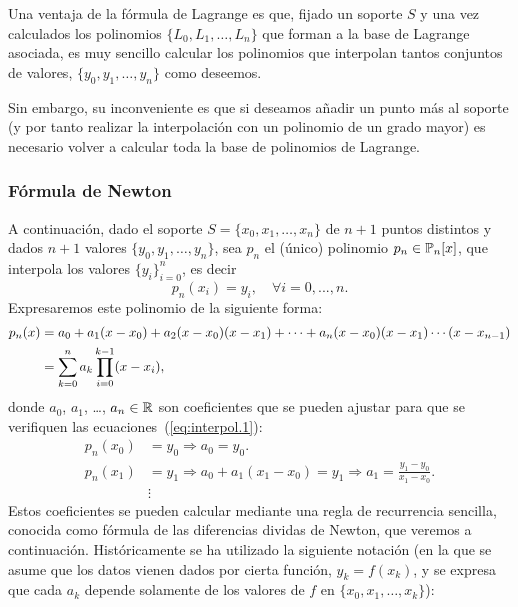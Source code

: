 \begin{remark}
  Una ventaja de la fórmula de Lagrange es que, fijado un soporte $S$
  y una vez calculados los polinomios $\{L_0,L_1,\dots, L_n\}$ que
  forman a la base de Lagrange asociada, es muy sencillo calcular los
  polinomios que interpolan tantos conjuntos de valores,
  $\{y_0,y_1,\dots,y_n\}$ como deseemos. 
  
  Sin embargo, su inconveniente es que si deseamos añadir un punto más
  al soporte (y por tanto realizar la interpolación con un polinomio
  de un grado mayor) es necesario volver a calcular toda la base de
  polinomios de Lagrange.
\end{remark}

\subsubsection{Fórmula de Newton}
\label{sec:formula-de-newton}
A continuación, dado el soporte $S=\{x_0,x_1,\dots,x_n\}$ de $n+1$ puntos
distintos y dados $n+1$ valores $\{y_0,y_1,\dots,y_n\}$, sea
$p_n$ el (único) polinomio $p_n \in \operatorname{{\mathbb P}}_n[x]$, que
interpola los valores $\{y_i\}_{i=0}^n$, es decir
\begin{equation}
p_n(x_i)=y_i, \quad \forall i=0,...,n.
\label{eq:interpol.1}
\end{equation}
Expresaremos este polinomio de la siguiente forma:
\begin{align}
  \notag
  p_n(x)&=a_0 + a_1 (x-x_0) + a_2(x-x_0)(x-x_1) + \cdots 
  + a_n(x-x_0)(x-x_1)\cdots(x-x_{n-1}) \\
  &=\sum_{k=0}^n a_k \prod_{i=0}^{k-1}(x-x_i),
\label{eq:pol.newton.dif-div}
\end{align}
donde $a_0$, $a_1$, \dots, $a_n\in\operatorname{{\mathbb R}}$ son coeficientes que se
pueden ajustar para que se verifiquen las
ecuaciones~(\ref{eq:interpol.1}):
\begin{align*}
  p_n(x_0)&=y_0 \Rightarrow a_0=y_0.\\
  p_n(x_1)&=y_1 \Rightarrow a_0+a_1(x_1-x_0)=y_1 
  \Rightarrow a_1=\frac{y_1-y_0}{x_1-x_0}.\\
  &\vdots
\end{align*}
Estos coeficientes se pueden calcular mediante una regla de
recurrencia sencilla, conocida como fórmula de las diferencias dividas
de Newton, que veremos a continuación. Históricamente se ha utilizado
la siguiente notación (en la que se asume que los datos vienen dados
por cierta función, $y_k=f(x_k)$, y se expresa que cada $a_k$ depende
solamente de los valores de $f$ en $\{x_0,x_1,\dots,x_k\}$):
